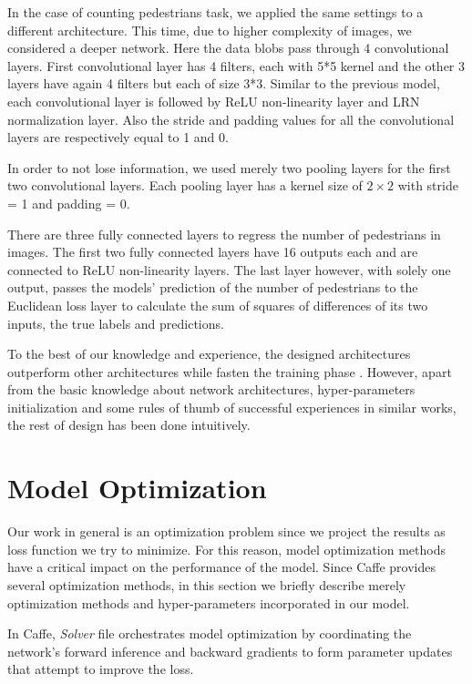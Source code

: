 In the case of counting pedestrians task, we applied the same settings to a different architecture. This time, due to higher complexity of images, we considered a deeper network. Here the data blobs pass through 4 convolutional layers. First convolutional layer has 4 filters, each with 5*5 kernel and the other 3 layers have again 4 filters but each of size 3*3. Similar to the previous model, each convolutional layer is followed by ReLU non-linearity layer and LRN normalization layer. Also the stride and padding values for all the convolutional layers are respectively equal to 1 and 0. 

\indent In order to not lose information, we used merely two pooling layers for the first two convolutional layers. Each pooling layer has a kernel size of $2\times2$ with stride = 1  and padding = 0. 

There are three fully connected layers to regress the number of pedestrians in images. The first two fully connected layers have 16 outputs each and are connected to ReLU non-linearity layers. The last layer however, with solely one output, passes the models' prediction of the number of pedestrians to the Euclidean loss layer to calculate the sum of squares of differences of its two inputs, the true labels and predictions.  

To the best of our knowledge and experience, the designed architectures outperform other architectures while fasten the training phase . However, apart from the basic knowledge about network architectures, hyper-parameters initialization and some rules of thumb of successful experiences in similar works, the rest of design has been done intuitively.


\section{Model Optimization}

Our work in general is an optimization problem since we project the results as loss function we try to minimize. For this reason, model optimization methods have a critical impact on the performance of the model. Since Caffe provides several optimization methods, in this section we briefly describe merely optimization methods and hyper-parameters incorporated in our model.  

\indent In Caffe, \textit{Solver} file  orchestrates model optimization by coordinating the network's forward inference and backward gradients to form parameter updates that attempt to improve the loss. 
